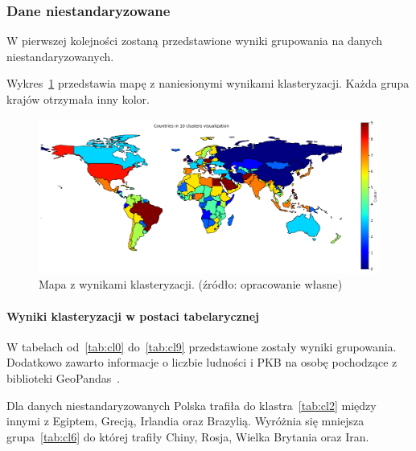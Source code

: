 \documentclass[11pt]{report}
\begin{document}
    \subsubsection{Dane niestandaryzowane}
    W pierwszej kolejności zostaną przedstawione wyniki grupowania na danych niestandaryzowanych.

    Wykres~\ref{fig:clust10} przedstawia mapę z naniesionymi wynikami klasteryzacji. Każda grupa krajów otrzymała inny kolor.

    \begin{figure}[ht!]
        \centering
        \includegraphics[width=1 \textwidth]{fig/CLUST/10clusterMap.png}
        \caption{Mapa z wynikami klasteryzacji. (źródło: opracowanie własne)}
        \label{fig:clust10}
    \end{figure}

    \paragraph{Wyniki klasteryzacji w postaci tabelarycznej}
    W tabelach od~\ref{tab:cl0} do~\ref{tab:cl9} przedstawione zostały wyniki grupowania.
    Dodatkowo zawarto informacje o liczbie ludności i PKB na osobę pochodzące z biblioteki GeoPandas~\cite{geopandas}.

    
    
    
    
    
    
    
    
    
    


    Dla danych niestandaryzowanych Polska trafiła do klastra~\ref{tab:cl2} między innymi z Egiptem, Grecją, Irlandia oraz Brazylią.
    Wyróżnia się mniejsza grupa~\ref{tab:cl6} do której trafiły Chiny, Rosja, Wielka Brytania oraz Iran.
\end{document}
